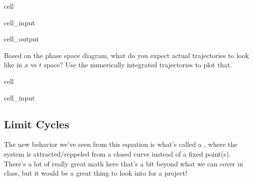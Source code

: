 \documentclass[letterpaper,10pt,english]{jupyterBook}
\begin{document}
\begin{sphinxuseclass}{cell}
\begin{sphinxVerbatimInput}
\begin{sphinxuseclass}{cell_input}
\end{sphinxuseclass}\end{sphinxVerbatimInput}
\begin{sphinxVerbatimOutput}

\begin{sphinxuseclass}{cell_output}
\noindent{}

\end{sphinxuseclass}\end{sphinxVerbatimOutput}

\end{sphinxuseclass}
\sphinxAtStartPar
{}

\sphinxAtStartPar
Based on the phase space diagram, what do you expect actual trajectories to look like in \(x\) vs \(t\) space? Use the numerically integrated trajectories to plot that.

\begin{sphinxuseclass}{cell}\begin{sphinxVerbatimInput}

\begin{sphinxuseclass}{cell_input}
\begin{sphinxVerbatim}[commandchars=\\\{\}]
\end{sphinxVerbatim}

\end{sphinxuseclass}\end{sphinxVerbatimInput}

\end{sphinxuseclass}

\subsection{Limit Cycles}
\label{\detokenize{content/1_mechanics/dynamical_2:limit-cycles}}
\sphinxAtStartPar
The new behavior we’ve seen from this equation is what’s called a , where the system is attracted/reppeled from a closed curve instead of a fixed point(s). There’s a lot of really great math here that’s a bit beyond what we can cover in class, but it would be a great thing to look into for a project!

\sphinxAtStartPar
{}
\end{document}
